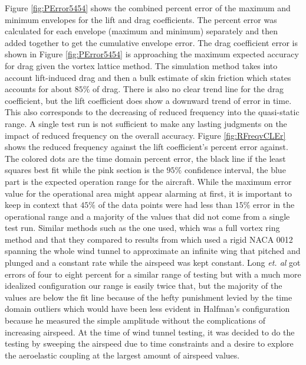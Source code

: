\documentclass[11pt]{ucthesis}
\begin{document}
Figure \ref{fig:PError5454} shows the combined percent error of the maximum and minimum envelopes for the lift and drag coefficients. The percent error was calculated for each envelope (maximum and minimum) separately and then added together to get the cumulative envelope error. The drag coefficient error is shown in Figure \ref{fig:PError5454} is approaching the maximum expected accuracy for drag given the vortex lattice method. The simulation method takes into account lift-induced drag and then a bulk estimate of skin friction which \cite{thomas1985aircraft} states accounts for about $85\%$ of drag. There is also no clear trend line for the drag coefficient, but the lift coefficient does show a downward trend of error in time. This also corresponds to the decreasing of reduced frequency into the quasi-static range. A single test run is not sufficient to make any lasting judgments on the impact of reduced frequency on the overall accuracy. Figure \ref{fig:RFreqvCLEr} shows the reduced frequency against the lift coefficient's percent error against. The colored dots are the time domain percent error, the black line if the least squares best fit while the pink section is the $95\%$ confidence interval, the blue part is the expected operation range for the aircraft. While the maximum error value for the operational area might appear alarming at first, it is important to keep in context that $45\%$ of the data points were had less than $15\%$ error in the operational range and a majority of the values that did not come from a single test run. Similar methods such as the one \cite{long2004object} used, which was a full vortex ring method and that they compared to results from \cite{halfman1952experimental} which used a rigid NACA 0012 spanning the whole wind tunnel to approximate an infinite wing that pitched and plunged and a constant rate while the airspeed was kept constant. Long {\it et. al} got errors of four to eight percent for a similar range of testing but with a much more idealized configuration our range is easily twice that, but the majority of the values are below the fit line because of the hefty punishment levied by the time domain outliers which would have been less evident in Halfman's configuration because he measured the simple amplitude without the complications of increasing airspeed. At the time of wind tunnel testing, it was decided to do the testing by sweeping the airspeed due to time constraints and a desire to explore the aeroelastic coupling at the largest amount of airspeed values.
\end{document}
